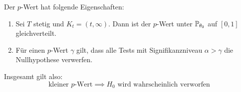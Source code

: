 Der \(p\)-Wert hat folgende Eigenschaften:
\begin{enumerate}
	\item Sei \(T\) stetig und \(K_t = (t, \infty)\). Dann ist der \(p\)-Wert unter \(\P_{\theta_0}\) auf \([0,1]\) gleichverteilt.
	\item Für einen \(p\)-Wert \(\gamma\) gilt, dass alle Tests mit Signifikanzniveau \(\alpha > \gamma\) die Nullhypothese verwerfen.
\end{enumerate}

Insgesamt gilt also:
\[\text{kleiner } p\text{-Wert} \implies H_0 \text{ wird wahrscheinlich verworfen} \]


